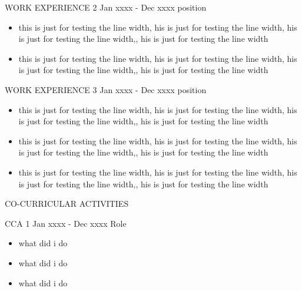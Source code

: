 \documentclass[11pt]{article}
\begin{document}
\begin{body2}
{WORK EXPERIENCE 2}
{Jan xxxx - Dec xxxx}
{position}

\noindent \begin{minipage}{16cm}
\begin{itemize}[leftmargin=*]
	\item  this is just for testing the line width,  his is just for testing the line width, his is just for testing the line width,, his is just for testing the line width 
	\item  this is just for testing the line width,  his is just for testing the line width, his is just for testing the line width,, his is just for testing the line width 
\end{itemize}
\end{minipage}
\end{body2}


\begin{body2}
{WORK EXPERIENCE 3}
{Jan xxxx - Dec xxxx}
{position}

\noindent \begin{minipage}{16cm}
\begin{itemize}[leftmargin=*]
	\item  this is just for testing the line width,  his is just for testing the line width, his is just for testing the line width,, his is just for testing the line width  
	\item  this is just for testing the line width,  his is just for testing the line width, his is just for testing the line width,, his is just for testing the line width 
	\item  this is just for testing the line width,  his is just for testing the line width, his is just for testing the line width,, his is just for testing the line width 
\end{itemize}
\end{minipage}
\end{body2}




\begin{SectionHeaders}{CO-CURRICULAR ACTIVITIES}
\end{SectionHeaders}

\begin{body2}
{CCA 1}
{Jan xxxx - Dec xxxx}
{Role}

\noindent \begin{minipage}{16cm}
\begin{itemize}[leftmargin=*]
	\item what did i do
	\item what did i do
	\item what did i do
\end{itemize}
\end{minipage}
\end{body2}
\end{document}
